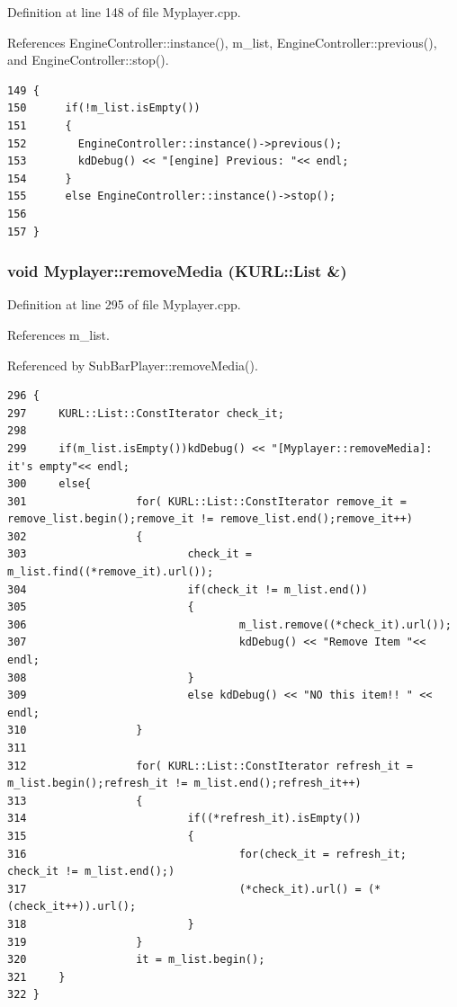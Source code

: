 Definition at line 148 of file Myplayer.cpp.

References Engine\-Controller::instance(), m\_\-list, Engine\-Controller::previous(), and Engine\-Controller::stop().



\footnotesize\begin{verbatim}149 {
150      if(!m_list.isEmpty())
151      {
152        EngineController::instance()->previous();
153        kdDebug() << "[engine] Previous: "<< endl;
154      }
155      else EngineController::instance()->stop();
156      
157 }
\end{verbatim}\normalsize 
{}
\subsubsection{\setlength{\rightskip}{0pt plus 5cm}void Myplayer::remove\-Media (KURL::List \&)\hspace{0.3cm}{\tt  [slot]}}\label{classMyplayer_Myplayeri19}




Definition at line 295 of file Myplayer.cpp.

References m\_\-list.

Referenced by Sub\-Bar\-Player::remove\-Media().



\footnotesize\begin{verbatim}296 {       
297     KURL::List::ConstIterator check_it;
298         
299     if(m_list.isEmpty())kdDebug() << "[Myplayer::removeMedia]: it's empty"<< endl;
300     else{
301                 for( KURL::List::ConstIterator remove_it = remove_list.begin();remove_it != remove_list.end();remove_it++)
302                 {
303                         check_it = m_list.find((*remove_it).url());      
304                         if(check_it != m_list.end())
305                         {
306                                 m_list.remove((*check_it).url());
307                                 kdDebug() << "Remove Item "<< endl;
308                         }
309                         else kdDebug() << "NO this item!! " << endl;
310                 }
311         
312                 for( KURL::List::ConstIterator refresh_it = m_list.begin();refresh_it != m_list.end();refresh_it++)  
313                 {
314                         if((*refresh_it).isEmpty())
315                         {
316                                 for(check_it = refresh_it; check_it != m_list.end();)
317                                 (*check_it).url() = (*(check_it++)).url();                  
318                         }         
319                 }
320                 it = m_list.begin();   
321     } 
322 }
\end{verbatim}\normalsize 
{}
